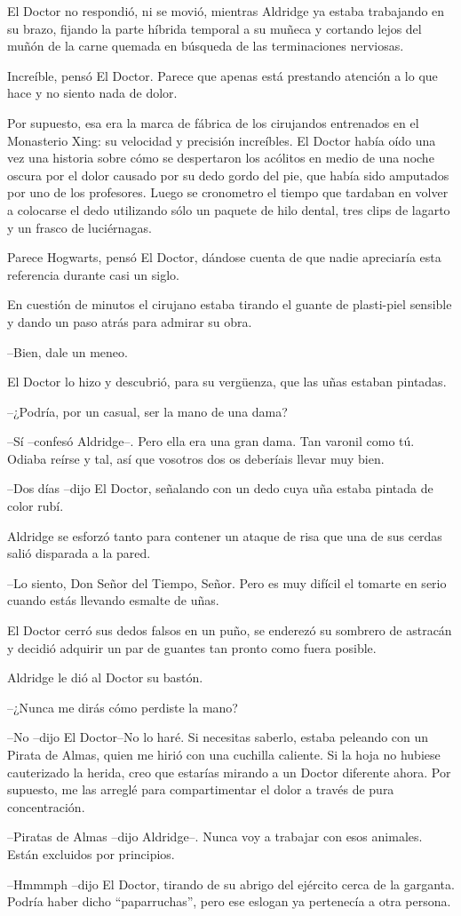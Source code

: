 El Doctor no respondió, ni se movió, mientras Aldridge ya estaba trabajando en su brazo, fijando la parte híbrida temporal a su muñeca y cortando lejos del muñón de la carne quemada en búsqueda de las terminaciones nerviosas.

Increíble, pensó El Doctor. Parece que apenas está prestando atención a lo que hace y no siento nada de dolor.

Por supuesto, esa era la marca de fábrica de los cirujandos entrenados en el  Monasterio Xing: su velocidad y precisión increíbles. El Doctor había oído una vez una historia sobre cómo se despertaron los acólitos en medio de una noche oscura por el dolor causado por su dedo gordo del pie, que  había sido amputados por uno de los profesores. Luego se cronometro el tiempo que tardaban en volver a colocarse el dedo utilizando sólo un paquete de hilo dental, tres clips de lagarto y un frasco de luciérnagas.

Parece Hogwarts, pensó El Doctor, dándose cuenta de que nadie apreciaría esta referencia durante casi un siglo.

En cuestión de minutos el cirujano estaba tirando el guante de plasti-piel sensible y dando un paso atrás para admirar su obra.

--Bien, dale un meneo.

El Doctor lo hizo y descubrió, para su vergüenza, que las uñas estaban pintadas.

--¿Podría, por un casual, ser la mano de una dama?

--Sí --confesó Aldridge--. Pero ella era una gran dama. Tan varonil como tú. Odiaba reírse y tal, así que vosotros dos os deberíais llevar muy bien.

--Dos días --dijo El Doctor, señalando con un dedo cuya uña estaba pintada de color rubí.

Aldridge se esforzó tanto para contener un ataque de risa que una de sus cerdas salió disparada a la pared. 

--Lo siento, Don Señor del Tiempo, Señor. Pero es muy difícil el tomarte en serio cuando estás llevando  esmalte de uñas.

El Doctor cerró sus dedos falsos en un puño, se enderezó su sombrero de astracán y decidió adquirir un par de guantes tan pronto como fuera posible.

Aldridge le dió al Doctor su bastón.

--¿Nunca me dirás cómo perdiste la mano?

--No --dijo El Doctor--No lo haré. Si necesitas saberlo, estaba peleando con un Pirata de Almas, quien me hirió con una cuchilla caliente. Si la hoja no hubiese cauterizado la herida, creo que estarías mirando a un Doctor diferente ahora. Por supuesto, me las arreglé para compartimentar el dolor a través de pura concentración.

--Piratas de Almas --dijo Aldridge--. Nunca voy a trabajar con esos animales. Están excluidos por principios.

--Hmmmph --dijo El Doctor, tirando de su abrigo del ejército cerca de la garganta. Podría haber dicho ``paparruchas'', pero ese eslogan ya pertenecía a otra persona.
